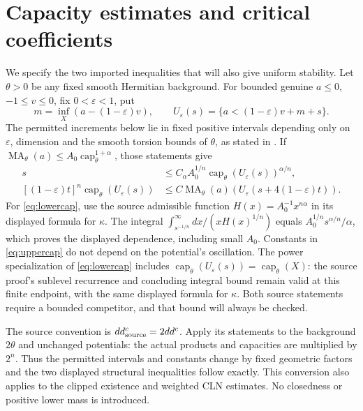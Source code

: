 \documentclass[11pt]{article}
\newcommand{\ddc}{dd^c}
\newcommand{\MA}{\operatorname{MA}}
\newcommand{\capH}{\operatorname{cap}}
\theoremstyle{remark}\newtheorem{remark}[theorem]{Remark}
\begin{document}
\section{Capacity estimates and critical coefficients}
We specify the two imported inequalities that will also give uniform
stability. Let $\theta>0$ be any fixed smooth Hermitian background.
For bounded genuine $a\leq0$, $-1\leq v\leq0$, fix $0<\varepsilon<1$,
put
\[
 m=\inf_X(a-(1-\varepsilon)v),\qquad
 U_\varepsilon(s)=\{a<(1-\varepsilon)v+m+s\}.
\]
The permitted increments below lie in fixed positive intervals depending
only on $\varepsilon$, dimension and the smooth torsion bounds of
$\theta$, as stated in \cite[Theorem 5.3 and Lemma 5.4]{KN}.
If $\MA_\theta(a)\leq A_0\capH_\theta^{1+\alpha}$, those statements give
\begin{align}
 s&\leq C_\alpha A_0^{1/n}
                 \capH_\theta(U_\varepsilon(s))^{\alpha/n},
                 \label{eq:lowercap}\\
 [(1-\varepsilon)t]^n\capH_\theta(U_\varepsilon(s))
  &\leq C\MA_\theta(a)
          (U_\varepsilon(s+4(1-\varepsilon)t)).\label{eq:uppercap}
\end{align}
For \eqref{eq:lowercap}, use the source admissible function
$H(x)=A_0^{-1}x^{n\alpha}$ in its displayed formula for $\kappa$.
The integral $\int_{s^{-1/n}}^\infty dx/(xH(x)^{1/n})$
equals $A_0^{1/n}s^{\alpha/n}/\alpha$, which proves the displayed
dependence, including small $A_0$. Constants in
\eqref{eq:uppercap} do not depend on the potential's oscillation.
The power specialization of \eqref{eq:lowercap} includes
$\capH_\theta(U_\varepsilon(s))=\capH_\theta(X)$: the source proof's
sublevel recurrence and concluding integral bound remain valid at this
finite endpoint, with the same displayed formula for $\kappa$.
Both source statements require a bounded competitor, and that bound
will always be checked.

The source convention is $\ddc_{\rm source}=2\ddc$.
Apply its statements to the background $2\theta$ and unchanged
potentials: the actual products and capacities are multiplied by $2^n$.
Thus the permitted intervals and constants change by fixed geometric
factors and the two displayed structural inequalities follow exactly.
This conversion also applies to the clipped existence and weighted
CLN estimates. No closedness or positive lower mass is introduced.
\end{document}
